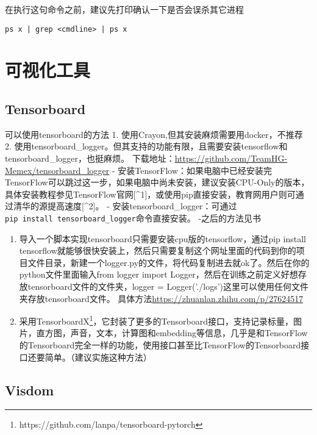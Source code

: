 \documentclass[11pt]{article}
\begin{document}
在执行这句命令之前，建议先打印确认一下是否会误杀其它进程

\begin{verbatim}
ps x | grep <cmdline> | ps x
\end{verbatim}

    \section{可视化工具}\label{ux53efux89c6ux5316ux5de5ux5177}

\subsection{Tensorboard}\label{tensorboard}

可以使用tensorboard的方法 1. 使用Crayon,但其安装麻烦需要用docker，不推荐
2.
使用tensorboard\_logger。但其支持的功能有限，且需要安装tensorflow和tensorboard\_logger，也挺麻烦。
下载地址：\url{https://github.com/TeamHG-Memex/tensorboard_logger} -
安装TensorFlow：如果电脑中已经安装完TensorFlow可以跳过这一步，如果电脑中尚未安装，建议安装CPU-Only的版本，具体安装教程参见TensorFlow官网{[}\^{}1{]}，或使用pip直接安装，教育网用户则可通过清华的源提高速度{[}\^{}2{]}。
-
安装tensorboard\_logger：可通过\texttt{pip\ install\ tensorboard\_logger}命令直接安装。
-之后的方法见书

\begin{enumerate}
\def\labelenumi{\arabic{enumi}.}
\setcounter{enumi}{2}
\item
  导入一个脚本实现tensorboard只需要安装cpu版的tensorflow，通过pip
  install
  tensorflow就能够很快安装上，然后只需要复制这个网址里面的代码到你的项目文件目录，新建一个logger.py的文件，将代码复制进去就ok了。然后在你的python文件里面输入from
  logger import
  Logger，然后在训练之前定义好想存放tensorboard文件的文件夹，logger =
  Logger('./logs')这里可以使用任何文件夹存放tensorboard文件。
  具体方法\url{https://zhuanlan.zhihu.com/p/27624517}
\item
  采用TensorboardX\footnote{https://github.com/lanpa/tensorboard-pytorch}，它封装了更多的Tensorboard接口，支持记录标量，图片，直方图，声音，文本，计算图和embedding等信息，几乎是和TensorFlow的Tensorboard完全一样的功能，使用接口甚至比TensorFlow的Tensorboard接口还要简单。（建议实施这种方法）
\end{enumerate}

    \subsection{Visdom}\label{visdom}
\end{document}
